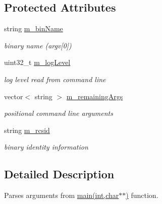 \subsection*{Protected Attributes}
\begin{DoxyCompactItemize}
\item 
string \hyperlink{classxtd_1_1Application_abdf4c6f863c5a7a4ee842906f546c458}{m\-\_\-bin\-Name}
\begin{DoxyCompactList}\small\item\em binary name (argv\mbox{[}0\mbox{]}) \end{DoxyCompactList}\item 
uint32\-\_\-t \hyperlink{classxtd_1_1Application_a3f815061d81aa12974b2b6ee48b9f5e9}{m\-\_\-log\-Level}
\begin{DoxyCompactList}\small\item\em log level read from command line \end{DoxyCompactList}\item 
vector$<$ string $>$ \hyperlink{classxtd_1_1Application_a7651fd3849530cdded556187a6b42c25}{m\-\_\-remaining\-Args}
\begin{DoxyCompactList}\small\item\em positional command line arguments \end{DoxyCompactList}\item 
string \hyperlink{classxtd_1_1Application_ad820953bc15b729ce010f422595d3a3f}{m\-\_\-rcsid}
\begin{DoxyCompactList}\small\item\em binary identity information \end{DoxyCompactList}\end{DoxyCompactItemize}


\subsection{Detailed Description}
Parses arguments from \hyperlink{doc_2example_2Application_8hh_a6b77b2233054447db17959182b5fb02b}{main(int,char$\ast$$\ast$)} function. 


